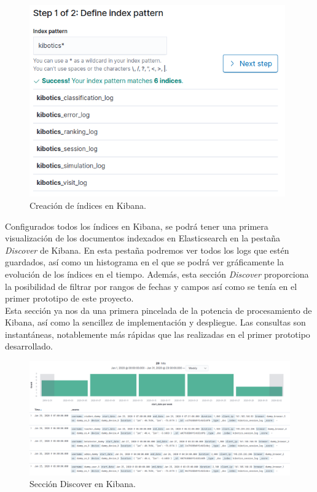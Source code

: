 \documentclass[11pt,a4paper]{book}
\begin{document}
				\begin{figure}[H]
					\centering
					\includegraphics[width=11cm, keepaspectratio]{img/index_pattern_kibana.png}
					\caption{Creación de índices en Kibana.}
					\label{fig:index_pattern_kibana}
				\end{figure}
			
				Configurados todos los índices en Kibana, se podrá tener una primera visualización de los documentos indexados en Elasticsearch en la pestaña \textit{Discover} de Kibana. En esta pestaña podremos ver todos los logs que estén guardados, así como un histograma en el que se podrá ver gráficamente la evolución de los índices en el tiempo. Además, esta sección \textit{Discover} proporciona la posibilidad de filtrar por rangos de fechas y campos así como se tenía en el primer prototipo de este proyecto.\\
				
				Esta sección ya nos da una primera pincelada de la potencia de procesamiento de Kibana, así como la sencillez de implementación y despliegue. Las consultas son instantáneas, notablemente más rápidas que las realizadas en el primer prototipo desarrollado.\\
				
				\begin{figure}[H]
					\centering
					\includegraphics[width=15cm, keepaspectratio]{img/discover_kibana.png}
					\caption{Sección Discover en Kibana.}
					\label{fig:discover_kibana}
				\end{figure}
			
\end{document}
